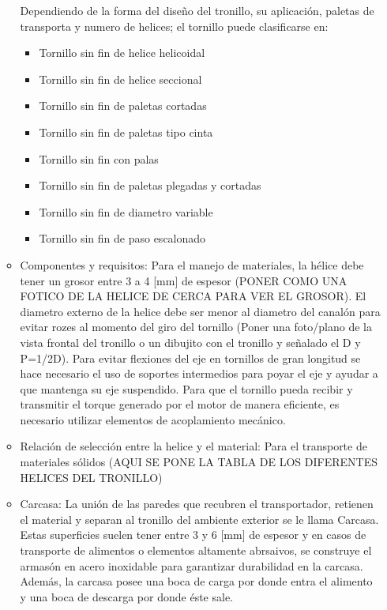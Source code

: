 \begin{itemize}
\begin{itemize}

Dependiendo de la forma del diseño del tronillo, su aplicación, paletas de transporta y numero de helices; el tornillo puede clasificarse en: 

	\begin{itemize}
	\item Tornillo sin fin de helice helicoidal
	\item Tornillo sin fin de helice seccional
	\item Tornillo sin fin de paletas cortadas
	\item Tornillo sin fin de paletas tipo cinta
	\item Tornillo sin fin con palas
	\item Tornillo sin fin de paletas plegadas y cortadas
	\item Tornillo sin fin de diametro variable
	\item Tornillo sin fin de paso escalonado
	\end{itemize}

\item Componentes y requisitos: Para el manejo de materiales, la hélice debe tener un grosor entre 3 a 4 [mm] de espesor (PONER COMO UNA FOTICO DE LA HELICE DE CERCA PARA VER EL GROSOR). El diametro externo de la helice debe ser menor al diametro del canalón para evitar rozes al momento del giro del tornillo (Poner una foto/plano de la vista frontal del tronillo o un dibujito con el tronillo y señalado el D y P=1/2D). Para evitar flexiones del eje en tornillos de gran longitud se hace necesario el uso de soportes intermedios  para poyar el eje y ayudar a que mantenga su eje  suspendido. Para que el tornillo pueda recibir y transmitir el torque generado por el motor de manera eficiente, es necesario utilizar elementos de acoplamiento mecánico.


\item Relación de selección entre la helice y el material:  Para el transporte de materiales sólidos (AQUI SE PONE LA TABLA DE LOS DIFERENTES HELICES DEL TRONILLO)

\item Carcasa: La unión de las paredes que recubren el transportador, retienen el material y separan al tronillo del ambiente exterior se le llama Carcasa. Estas superficies suelen tener entre 3 y 6 [mm] de espesor y en casos de transporte de alimentos o elementos altamente abrsaivos, se construye el armasón en acero inoxidable  para garantizar  durabilidad en la carcasa. Además, la carcasa posee una boca de carga por donde entra el alimento y una boca de descarga por donde éste sale.


\end{itemize}
\end{itemize}

